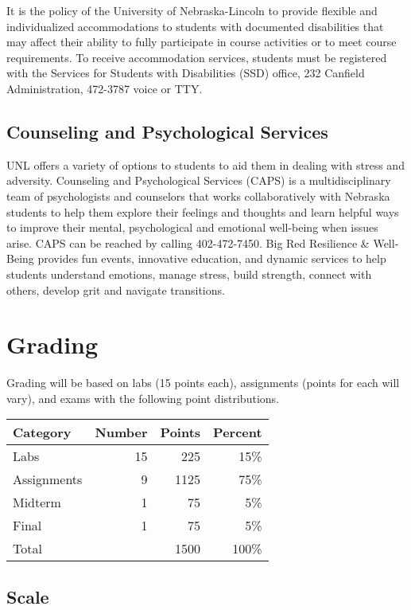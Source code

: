 \documentclass[12pt]{scrartcl}
\begin{document}
It is the policy of the University of Nebraska-Lincoln to 
provide flexible and individualized accommodations to students 
with documented disabilities that may affect their ability to 
fully participate in course activities or to meet course 
requirements.  To receive accommodation services, students 
must be registered with the Services for Students with 
Disabilities (SSD) office, 232 Canfield Administration, 
472-3787 voice or TTY.

\subsection{Counseling and Psychological Services}

UNL offers a variety of options to students to aid them in 
dealing with stress and adversity.  Counseling and Psychological 
Services (CAPS) is a multidisciplinary team of psychologists and 
counselors that works collaboratively with Nebraska students to 
help them explore their feelings and thoughts and learn helpful 
ways to improve their mental, psychological and emotional 
well-being when issues arise. CAPS can be reached by calling 
402-472-7450. Big Red Resilience \& Well-Being provides fun 
events, innovative education, and dynamic services to help 
students understand emotions, manage stress, build strength, 
connect with others, develop grit and navigate transitions.

\section{Grading}

Grading will be based on labs (15 points each), assignments (points
for each will vary), and exams with the following point distributions.

\begin{table}[h]
\centering
\begin{tabular}{lrrr}
Category & Number & Points & Percent \\
\hline\hline
Labs        & 15 & 225 & 15\% \\
Assignments & 9  & 1125 & 75\% \\
Midterm     & 1  & 75 & 5\% \\
Final       & 1  & 75 & 5\% \\
\hline
Total & ~ & 1500 & 100\% 
\end{tabular}
\end{table}

\subsection{Scale}
\end{document}
